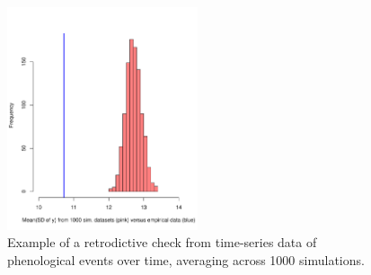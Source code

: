 \documentclass[11pt]{article}
\begin{document}
\begin{figure}[ht]
\centering
\noindent \includegraphics[width=0.5\textwidth]{examples/synchrony/graphs/retroSDsync.pdf}
\caption{Example of a retrodictive check from time-series data of phenological events over time, averaging across 1000 simulations.}
\label{fig:retrodictivecheckSD}
\end{figure}
\end{document}
